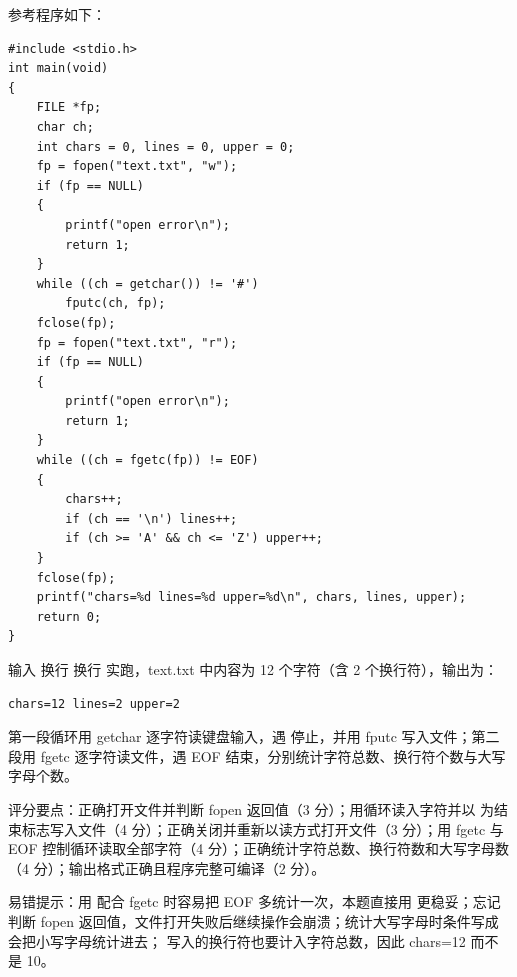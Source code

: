 \documentclass[a4paper,11pt]{article}
\begin{document}

\q 参考程序如下：
\begin{lstlisting}[language={[custom]C}]
#include <stdio.h>
int main(void)
{
    FILE *fp;
    char ch;
    int chars = 0, lines = 0, upper = 0;
    fp = fopen("text.txt", "w");
    if (fp == NULL)
    {
        printf("open error\n");
        return 1;
    }
    while ((ch = getchar()) != '#')
        fputc(ch, fp);
    fclose(fp);
    fp = fopen("text.txt", "r");
    if (fp == NULL)
    {
        printf("open error\n");
        return 1;
    }
    while ((ch = fgetc(fp)) != EOF)
    {
        chars++;
        if (ch == '\n') lines++;
        if (ch >= 'A' && ch <= 'Z') upper++;
    }
    fclose(fp);
    printf("chars=%d lines=%d upper=%d\n", chars, lines, upper);
    return 0;
}
\end{lstlisting}
\begin{analysis}输入  换行  换行 \code{\#} 实跑，text.txt 中内容为 12 个字符（含 2 个换行符），输出为：
\begin{lstlisting}
chars=12 lines=2 upper=2
\end{lstlisting}
第一段循环用 getchar 逐字符读键盘输入，遇 \code{\#} 停止，并用 fputc 写入文件；第二段用 fgetc 逐字符读文件，遇 EOF 结束，分别统计字符总数、换行符个数与大写字母个数。\end{analysis}
\begin{analysis}评分要点：正确打开文件并判断 fopen 返回值（3 分）；用循环读入字符并以 \code{\#} 为结束标志写入文件（4 分）；正确关闭并重新以读方式打开文件（3 分）；用 fgetc 与 EOF 控制循环读取全部字符（4 分）；正确统计字符总数、换行符数和大写字母数（4 分）；输出格式正确且程序完整可编译（2 分）。\end{analysis}
\begin{analysis}易错提示：用  配合 fgetc 时容易把 EOF 多统计一次，本题直接用  更稳妥；忘记判断 fopen 返回值，文件打开失败后继续操作会崩溃；统计大写字母时条件写成  会把小写字母统计进去； 写入的换行符也要计入字符总数，因此 chars=12 而不是 10。\end{analysis}
\end{document}

